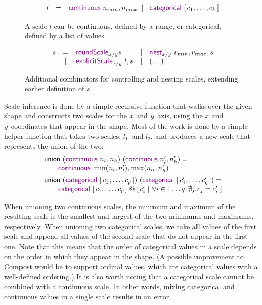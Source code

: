 \documentclass{jfp}
\newcommand{\X}{\emph{x}\ }
\newcommand{\Y}{\emph{y}\ }
\newcommand{\lsep}{\;\;|\;\;}
\newcommand{\ident}[1]{\textnormal{\textcolor{idclr}{\sffamily #1}}}
\newcommand{\kvd}[1]{\textnormal{\textcolor{kvdclr}{\sffamily #1}}}
\begin{document}
\begin{figure}
\vspace{-0.5em}
\begin{equation*}
\begin{array}{rcl}
l & = & \kvd{continuous}~n_{min}, n_{max} \lsep \kvd{categorical}~[\,c_1, \ldots, c_k\,]
\end{array}
\end{equation*}
\vspace{-1em}
\caption{A scale $l$ can be continuous, defined by a range, or categorical, defined by a list of values.}
\label{fig:scale}
\vspace{-1em}
\end{figure}
\begin{figure}
\begin{equation*}
\begin{array}{rclcl}
s & = & \kvd{roundScale}_{x/y} s      &|& \kvd{nest}_{x/y}~v_{min}, v_{max}, s \\
  & | & \kvd{explicitScale}_{x/y}~l, s &|&  (\ldots)
\end{array}
\end{equation*}
\caption{Additional combinators for controlling and nesting scales, extending earlier definition of $s$.}
\label{fig:control}
\end{figure}

Scale inference is done by a simple recursive function that walks over the given shape and
constructs two scales for the \X and \Y axis, using the \X and \Y coordinates that appear in the shape.
Most of the work is done by a simple helper function that takes two scales, $l_1$~and $l_2$,
and produces a new scale that represents the union of the two:
%
\begin{equation*}
\begin{array}{l}
\ident{union}~(\kvd{continuous}~n_l, n_h)~(\kvd{continuous}~n'_l, n'_h) =\\
\qquad\kvd{continuous}~\min(n_l, n'_l), \max(n_h, n'_h)\\[0.5em]
\ident{union}~(\kvd{categorical}~[\,c_1, \ldots, c_p\,])~(\kvd{categorical}~[\,c'_1, \ldots, c'_q\,]) =\\
\qquad \kvd{categorical}~[\,c_1, \ldots, c_p\,] \;@\; [\,c'_i~|~ \forall i\in 1\ldots q, \nexists j. c_j = c'_i \;]
\end{array}
\end{equation*}

\vspace{-0.5em}
\noindent
When unioning two continuous scales, the minimum and maximum of the resulting scale is the smallest
and largest of the two minimums and maximums, respectively. When unioning two categorical scales,
we take all values of the first scale and append all values of the second scale that do not appear
in the first one. Note that this means that the order of categorical values in a scale depends on
the order in which they appear in the shape. (A possible improvement to Compost would be to support
ordinal values, which are categorical values with a well-defined ordering.) It is also worth noting
that a categorical scale cannot be combined with a continuous scale. In other words, mixing
categorical and continuous values in a single scale results in an error.
\end{document}
